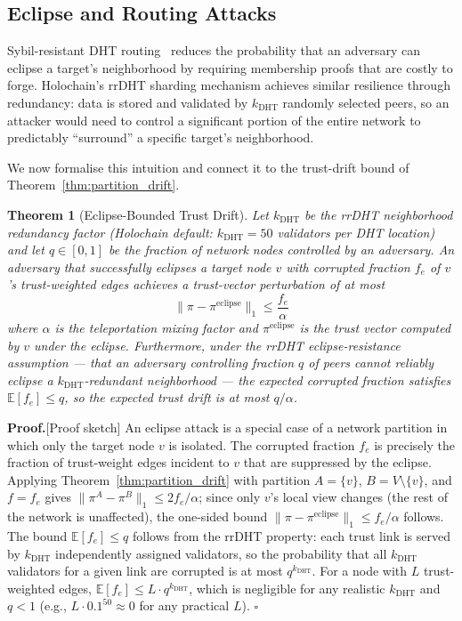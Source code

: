 \documentclass[11pt]{article}
\newtheorem{theorem}{Theorem}[section]
\newcommand{\qed}{\hfill}
\newenvironment{proof}{\noindent\textbf{Proof.}}{\qed$\square$\par\medskip}
\begin{document}
\subsection{Eclipse and Routing Attacks}

Sybil-resistant DHT routing~\cite{danezis2005} reduces the probability that an adversary can eclipse a target's neighborhood by requiring membership proofs that are costly to forge. Holochain's rrDHT sharding mechanism achieves similar resilience through redundancy: data is stored and validated by $k_{\text{DHT}}$ randomly selected peers, so an attacker would need to control a significant portion of the entire network to predictably ``surround'' a specific target's neighborhood.

We now formalise this intuition and connect it to the trust-drift bound of Theorem~\ref{thm:partition_drift}.

\begin{theorem}[Eclipse-Bounded Trust Drift]\label{thm:eclipse}
Let $k_{\text{DHT}}$ be the rrDHT neighborhood redundancy factor (Holochain default: $k_{\text{DHT}} = 50$ validators per DHT location) and let $q \in [0,1]$ be the fraction of network nodes controlled by an adversary. An adversary that successfully eclipses a target node $v$ with corrupted fraction $f_e$ of $v$'s trust-weighted edges achieves a trust-vector perturbation of at most
\[
    \|\pi - \pi^{\text{eclipse}}\|_1 \leq \frac{f_e}{\alpha}
\]
where $\alpha$ is the teleportation mixing factor and $\pi^{\text{eclipse}}$ is the trust vector computed by $v$ under the eclipse. Furthermore, under the rrDHT eclipse-resistance assumption --- that an adversary controlling fraction $q$ of peers cannot reliably eclipse a $k_{\text{DHT}}$-redundant neighborhood --- the expected corrupted fraction satisfies $\mathbb{E}[f_e] \leq q$, so the expected trust drift is at most $q/\alpha$.
\end{theorem}
\begin{proof}[Proof sketch]
An eclipse attack is a special case of a network partition in which only the target node $v$ is isolated. The corrupted fraction $f_e$ is precisely the fraction of trust-weight edges incident to $v$ that are suppressed by the eclipse. Applying Theorem~\ref{thm:partition_drift} with partition $A = \{v\}$, $B = V \setminus \{v\}$, and $f = f_e$ gives $\|\pi^A - \pi^B\|_1 \leq 2f_e/\alpha$; since only $v$'s local view changes (the rest of the network is unaffected), the one-sided bound $\|\pi - \pi^{\text{eclipse}}\|_1 \leq f_e/\alpha$ follows. The bound $\mathbb{E}[f_e] \leq q$ follows from the rrDHT property: each trust link is served by $k_{\text{DHT}}$ independently assigned validators, so the probability that all $k_{\text{DHT}}$ validators for a given link are corrupted is at most $q^{k_{\text{DHT}}}$. For a node with $L$ trust-weighted edges, $\mathbb{E}[f_e] \leq L \cdot q^{k_{\text{DHT}}}$, which is negligible for any realistic $k_{\text{DHT}}$ and $q < 1$ (e.g., $L \cdot 0.1^{50} \approx 0$ for any practical $L$).
\end{proof}
\end{document}

